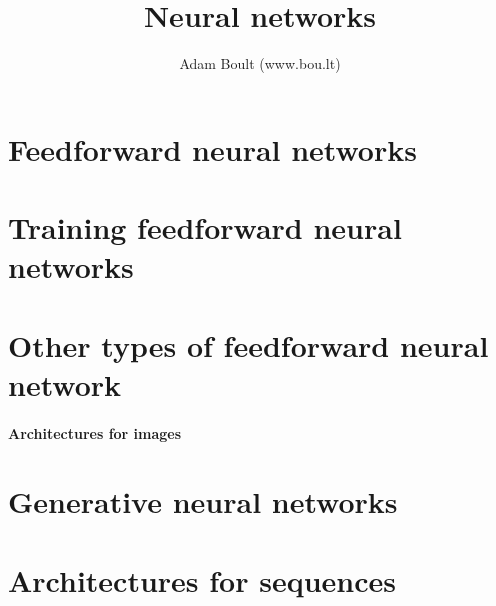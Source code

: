 \documentclass[oneside]{book}
\begin{document}
\author{Adam Boult (www.bou.lt)}
\title{Neural networks}
\maketitle

\setcounter{tocdepth}{0}
\tableofcontents



\part{Feedforward neural networks}



\part{Training feedforward neural networks}







\part{Other types of feedforward neural network}


\subsection{Architectures for images}


\part{Generative neural networks}





\part{Architectures for sequences}



\end{document}
